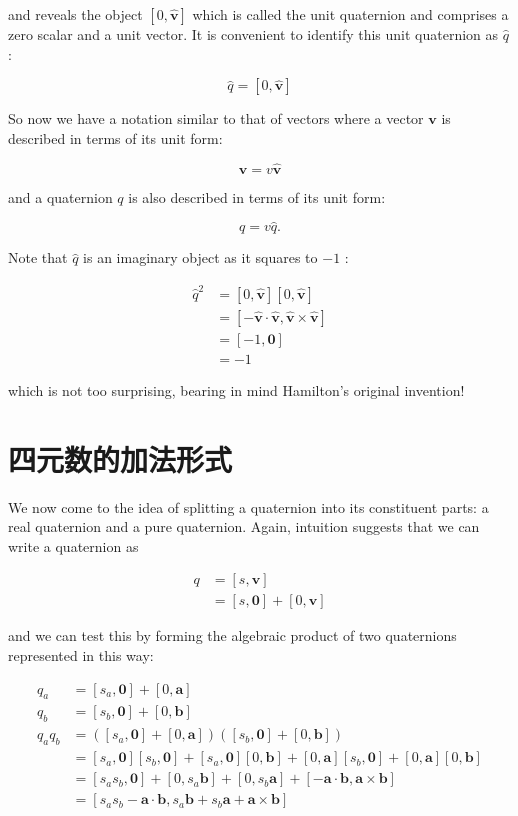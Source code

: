 and reveals the object $[0, \hat{\mathbf{v}}]$ which is called the unit quaternion and comprises a zero scalar and a unit vector. It is convenient to identify this unit quaternion as $\hat{q}$ :

$$
\hat{q}=[0, \hat{\mathbf{v}}]
$$

So now we have a notation similar to that of vectors where a vector $\mathbf{v}$ is described in terms of its unit form:

$$
\mathbf{v}=v \hat{\mathbf{v}}
$$

and a quaternion $q$ is also described in terms of its unit form:

$$
q=v \hat{q} .
$$

Note that $\hat{q}$ is an imaginary object as it squares to $-1$ :

$$
\begin{aligned}
\hat{q}^{2} & =[0, \hat{\mathbf{v}}][0, \hat{\mathbf{v}}] \\
& =[-\hat{\mathbf{v}} \cdot \hat{\mathbf{v}}, \hat{\mathbf{v}} \times \hat{\mathbf{v}}] \\
& =[-1, \mathbf{0}] \\
& =-1
\end{aligned}
$$

which is not too surprising, bearing in mind Hamilton's original invention!

\section{四元数的加法形式}
We now come to the idea of splitting a quaternion into its constituent parts: a real quaternion and a pure quaternion. Again, intuition suggests that we can write a quaternion as

$$
\begin{aligned}
q & =[s, \mathbf{v}] \\
& =[s, \mathbf{0}]+[0, \mathbf{v}]
\end{aligned}
$$

and we can test this by forming the algebraic product of two quaternions represented in this way:

$$
\begin{aligned}
q_{a} & =\left[s_{a}, \mathbf{0}\right]+[0, \mathbf{a}] \\
q_{b} & =\left[s_{b}, \mathbf{0}\right]+[0, \mathbf{b}] \\
q_{a} q_{b} & =\left(\left[s_{a}, \mathbf{0}\right]+[0, \mathbf{a}]\right)\left(\left[s_{b}, \mathbf{0}\right]+[0, \mathbf{b}]\right) \\
& =\left[s_{a}, \mathbf{0}\right]\left[s_{b}, \mathbf{0}\right]+\left[s_{a}, \mathbf{0}\right][0, \mathbf{b}]+[0, \mathbf{a}]\left[s_{b}, \mathbf{0}\right]+[0, \mathbf{a}][0, \mathbf{b}] \\
& =\left[s_{a} s_{b}, \mathbf{0}\right]+\left[0, s_{a} \mathbf{b}\right]+\left[0, s_{b} \mathbf{a}\right]+[-\mathbf{a} \cdot \mathbf{b}, \mathbf{a} \times \mathbf{b}] \\
& =\left[s_{a} s_{b}-\mathbf{a} \cdot \mathbf{b}, s_{a} \mathbf{b}+s_{b} \mathbf{a}+\mathbf{a} \times \mathbf{b}\right]
\end{aligned}
$$


